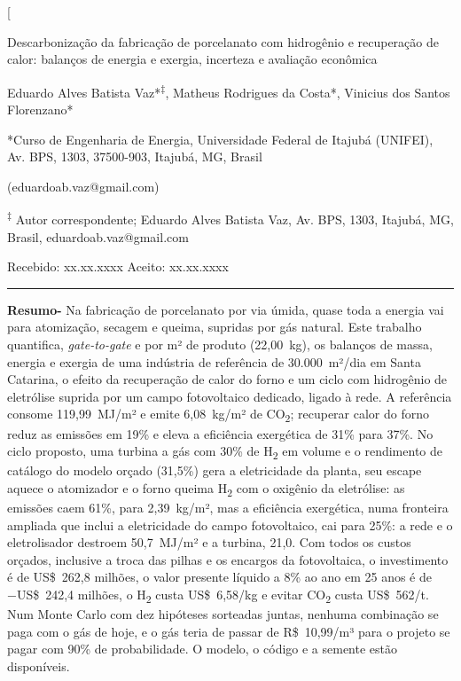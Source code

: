 \documentclass[10pt,a4paper,twocolumn]{article}
\newcommand{\Ht}{H\textsubscript{2}}
\newcommand{\COt}{CO\textsubscript{2}}
\begin{document}
\twocolumn[{%
\begin{center}
{\fontsize{24}{27}\selectfont Descarbonização da fabricação de porcelanato com hidrogênio e recuperação de calor: balanços de energia e exergia, incerteza e avaliação econômica\par}
\vspace{10pt}
{\fontsize{12}{14}\selectfont Eduardo Alves Batista Vaz*\textsuperscript{‡}, Matheus Rodrigues da Costa*, Vinicius dos Santos Florenzano*\par}
\vspace{6pt}
*Curso de Engenharia de Energia, Universidade Federal de Itajubá (UNIFEI), Av. BPS, 1303, 37500-903, Itajubá, MG, Brasil\par
(eduardoab.vaz@gmail.com)\par
\vspace{4pt}
\textsuperscript{‡} Autor correspondente; Eduardo Alves Batista Vaz, Av. BPS, 1303, Itajubá, MG, Brasil, eduardoab.vaz@gmail.com\par
\vspace{4pt}
Recebido: xx.xx.xxxx Aceito: xx.xx.xxxx\par
\end{center}
\vspace{2pt}
\noindent\rule{\textwidth}{0.4pt}\par\vspace{3pt}
\noindent\textbf{Resumo-} Na fabricação de porcelanato por via úmida, quase toda a energia vai para atomização, secagem e queima, supridas por gás natural. Este trabalho quantifica, \textit{gate-to-gate} e por m² de produto (22,00~kg), os balanços de massa, energia e exergia de uma indústria de referência de 30.000~m²/dia em Santa Catarina, o efeito da recuperação de calor do forno e um ciclo com hidrogênio de eletrólise suprida por um campo fotovoltaico dedicado, ligado à rede. A referência consome 119,99~MJ/m² e emite 6,08~kg/m² de \COt; recuperar calor do forno reduz as emissões em 19\% e eleva a eficiência exergética de 31\% para 37\%. No ciclo proposto, uma turbina a gás com 30\% de \Ht{} em volume e o rendimento de catálogo do modelo orçado (31,5\%) gera a eletricidade da planta, seu escape aquece o atomizador e o forno queima \Ht{} com o oxigênio da eletrólise: as emissões caem 61\%, para 2,39~kg/m², mas a eficiência exergética, numa fronteira ampliada que inclui a eletricidade do campo fotovoltaico, cai para 25\%: a rede e o eletrolisador destroem 50,7~MJ/m² e a turbina, 21,0. Com todos os custos orçados, inclusive a troca das pilhas e os encargos da fotovoltaica, o investimento é de US\$~262,8 milhões, o valor presente líquido a 8\% ao ano em 25 anos é de −US\$~242,4 milhões, o \Ht{} custa US\$~6,58/kg e evitar \COt{} custa US\$~562/t. Num Monte Carlo com dez hipóteses sorteadas juntas, nenhuma combinação se paga com o gás de hoje, e o gás teria de passar de R\$~10,99/m³ para o projeto se pagar com 90\% de probabilidade. O modelo, o código e a semente estão disponíveis.\par
}
\end{document}
